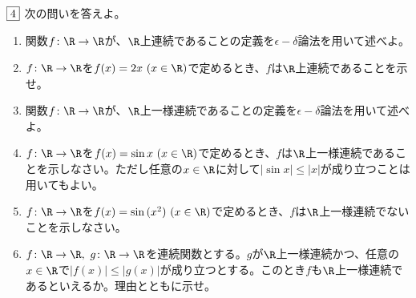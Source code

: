 \begin{tcolorbox} %
	$\fbox{4}$ 次の問いを答えよ。
\begin{enumerate}
	\item 関数$f\colon \R\to \R$が、$\R$上連続であることの定義を$\epsilon- \delta$論法を用いて述べよ。
	\item $f\colon \R\to \R$を$f(x)= 2x\ (x\in \R)$で定めるとき、$f$は$\R$上連続であることを示せ。
	\item 関数$f\colon \R\to \R$が、$\R$上一様連続であることの定義を$\epsilon- \delta$論法を用いて述べよ。
	\item $f\colon \R\to \R$を$f(x)= \sin{x}\ (x\in \R)$で定めるとき、$f$は$\R$上一様連続であることを示しなさい。ただし任意の$x\in \R$に対して$|\sin{x}|\le |x|$が成り立つことは用いてもよい。
	\item $f\colon \R\to \R$を$f(x)= \sin{(x^2)}\ (x\in \R)$で定めるとき、$f$は$\R$上一様連続でないことを示しなさい。
	\item $f\colon \R\to \R,\ g\colon \R\to \R$を連続関数とする。$g$が$\R$上一様連続かつ、任意の$x\in \R$で$|f(x)|\le |g(x)|$が成り立つとする。このとき$f$も$\R$上一様連続であるといえるか。理由とともに示せ。
\end{enumerate}
\end{tcolorbox}

